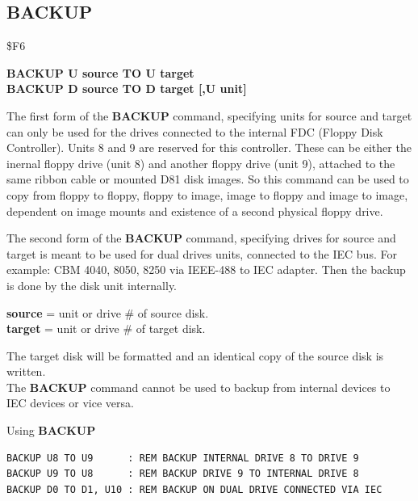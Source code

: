 
\newpage
\subsection{BACKUP}
\begin{description}[leftmargin=2cm,style=nextline]
\item [Token:] \$F6
\item [Format:] {\bf BACKUP U source TO U target} \\
                {\bf BACKUP D source TO D target [,U unit]}
\item [Usage:] The first form of the {\bf BACKUP} command, specifying
               units for source and target can only be used for the drives
               connected to the internal FDC (Floppy Disk Controller).
               Units 8 and 9 are reserved for this controller.
               These can be either the inernal floppy drive (unit 8) and
               another floppy drive (unit 9), attached to the same ribbon cable
               or mounted D81 disk images. So this command can be used to
               copy from floppy to floppy, floppy to image, image to floppy
               and image to image, dependent on image mounts and existence of
               a second physical floppy drive.

               The second form of the {\bf BACKUP} command, specifying
               drives for source and target is meant to be used for
               dual drives units, connected to the IEC bus.
   For example: CBM 4040, 8050, 8250 via IEEE-488 to IEC adapter.
   Then the backup is done by the disk unit internally.

   {\bf source} = unit or drive \# of source disk. \\
   {\bf target} = unit or drive \# of target disk.

\item [Remarks:] The target disk will be formatted and
                 an identical copy of the source disk is written. \\
                 The {\bf BACKUP} command cannot be used to backup
                 from internal devices to IEC devices or vice versa.

\item [Example:] Using {\bf BACKUP}

\begin{tcolorbox}[colback=black,coltext=white]
\verbatimfont{\codefont}
\begin{verbatim}
BACKUP U8 TO U9      : REM BACKUP INTERNAL DRIVE 8 TO DRIVE 9
BACKUP U9 TO U8      : REM BACKUP DRIVE 9 TO INTERNAL DRIVE 8
BACKUP D0 TO D1, U10 : REM BACKUP ON DUAL DRIVE CONNECTED VIA IEC
\end{verbatim}
\end{tcolorbox}
\end{description}

